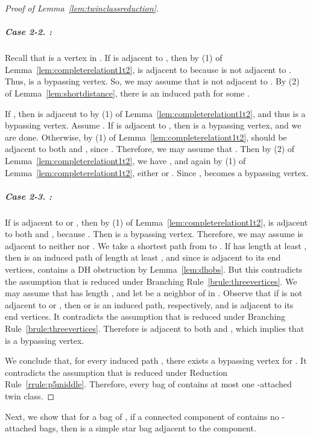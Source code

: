\documentclass[11pt]{elsarticle}
\begin{document}
\begin{proof}[Proof of Lemma~\ref{lem:twinclassreduction}]
\subparagraph{\textbf{Case 2-2.}  :}  
Recall that  is a vertex in .
If  is adjacent to , then by (1) of Lemma~\ref{lem:completerelationt1t2}, 
 is adjacent to 
because  is not adjacent to . Thus,  is a bypassing vertex.
So, we may assume that  is not adjacent to .
By (2) of Lemma~\ref{lem:shortdistance}, there is an induced path  for some .

If , then  is adjacent to  by (1) of Lemma~\ref{lem:completerelationt1t2}, and thus  is a bypassing vertex.
Assume . If  is adjacent to , then  is a bypassing vertex, and we are done.
Otherwise, by (1) of Lemma~\ref{lem:completerelationt1t2},  should be adjacent to both  and , since .
Therefore, we may assume that . 
Then 
by (2) of Lemma~\ref{lem:completerelationt1t2}, 
we have , and again by (1) of Lemma~\ref{lem:completerelationt1t2},
either  or .
Since ,  becomes a bypassing vertex.

\subparagraph{\textbf{Case 2-3.}  :}  
If  is adjacent to  or , then by (1) of Lemma~\ref{lem:completerelationt1t2},  
 is adjacent to both  and , because .
Then  is a bypassing vertex. Therefore, we may assume  is adjacent to neither  nor .
We take a shortest path  from  to .
If  has length at least , then  is an induced path of length at least , and 
since  is adjacent to its end vertices,  contains a DH obstruction by Lemma~\ref{lem:dhobs}.
But this contradicts the assumption that  is reduced under Branching Rule~\ref{brule:threevertices}.
We may assume that  has length , and let  be a neighbor of  in .
Observe that if  is not adjacent to  or , then  or  is an induced path, respectively, 
and  is adjacent to its end vertices. It contradicts the assumption that  is reduced under Branching Rule~\ref{brule:threevertices}.
Therefore  is adjacent to both  and , which implies that  is a bypassing vertex.

\medskip 
We conclude that, for every induced path , there exists a bypassing vertex for . It contradicts the assumption that  is reduced under Reduction Rule~\ref{rrule:p5middle}.
Therefore, every bag of  contains at most one -attached twin class.
\end{proof}


Next, we show that for a bag  of , if a connected component of  contains no -attached bags, then  is a simple star bag adjacent to the component.
\end{document}
